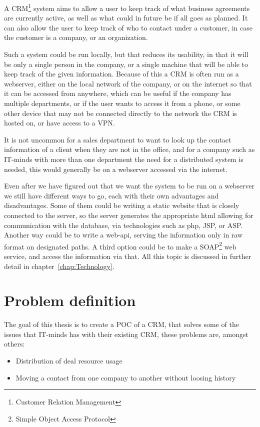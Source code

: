 A CRM\footnote{Customer Relation Management} system aims to allow a user to
keep track of what business agreements are currently active, as well as what
could in future be if all goes as planned. It can also allow the user to keep track of who
to contact under a customer, in case the customer is a company, or an organization.

Such a system could be run locally, but that reduces its usability, in that it will
be only a single person in the company, or a single machine that will be able to keep
track of the given information. Because of this a CRM is often run as a webserver, either
on the local network of the company, or on the internet so that it can be accessed
from anywhere, which can be useful if the company has multiple departments, or if the
user wants to access it from a phone, or some other device that may not be connected
directly to the network the CRM is hosted on, or have access to a VPN.

It is not uncommon for a sales department to want to look up the contact information
of a client when they are not in the office, and for a company such as IT-minds
with more than one department the need for a distributed system is needed, this would
generally be on a webserver accessed via the internet.

Even after we have figured out that we want the system to be run on a webserver we still have
different ways to go, each with their own advantages and disadvantages. Some of them
could be writing a static website that is closely connected to the server, so the server
generates the appropriate html allowing for communication with the database, via technologies
such as php, JSP, or ASP.
Another way could be to write a web-api, serving the information only in raw format
on designated paths. A third option could be to make a SOAP\footnote{Simple Object Access Protocol}
web service, and access the information via that.
All this topic is discussed in further detail in chapter~\ref{chap:Technology}.

\section{Problem definition}
\label{sec:Problem definition}
The goal of this thesis is to create a POC of a CRM, that solves some of the issues
that IT-minds has with their existing CRM, these problems are, amongst others:

\begin{itemize}
  \item Distribution of deal resource usage
  \item Moving a contact from one company to another without loosing history
\end{itemize}

